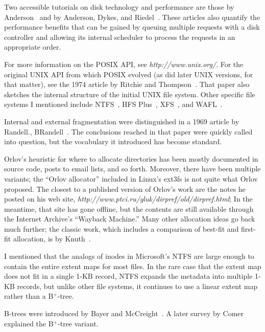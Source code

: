 Two accessible tutorials on disk technology and performance are those
by Anderson~\cite{max1118} and by Anderson, Dykes, and
Riedel~\cite{max1119}.  These articles also quantify the performance
benefits that can be gained by queuing multiple requests with a disk
controller and allowing its internal scheduler to process the requests
in an appropriate order.

For more information on the POSIX API, see
\textit{http://www.unix.org/}.  For the original UNIX API from which POSIX
evolved (as did later UNIX versions, for that matter), see the 1974
article by Ritchie and Thompson~\cite{jhs2.3}.  That paper also
sketches the internal structure of the initial UNIX file system.
Other specific file systems I mentioned include NTFS~\cite{max981},
HFS Plus~\cite{max1133}, XFS~\cite{max1110}, and WAFL~\cite{max1115}.

Internal and external fragmentation were distinguished in a 1969
article by {Randell., B}Randell~\cite{max1058}.  The conclusions reached in that
paper were quickly called into question, but the vocabulary it
introduced has become standard.

Orlov's heuristic for where to allocate directories has been mostly
documented in source code, posts to email lists, and so forth.
Moreover, there have been multiple variants; the ``Orlov allocator''
included in Linux's ext3fs is not quite what Orlov proposed.  The
closest to a published version of Orlov's work are the notes he posted on
his web site, \textit{http://www.ptci.ru/}\linebreak[0]\textit{gluk/dirpref/old/dirpref.html};
In the meantime, that site has gone offline, but the contents are still
available through the Internet Archive's ``Wayback Machine.''
Many other allocation
ideas go back much further; the classic work, which includes a
comparison of best-fit and first-fit allocation, is by
Knuth~\cite{max1138}.

I mentioned that the analogs of inodes in Microsoft's NTFS are large
enough to contain the entire extent maps for most files.  In the rare
case that the extent map does not fit in a single 1-KB record, NTFS
expands the metadata into multiple 1-KB records, but unlike other file
systems, it continues to use a linear extent map rather than a B$^+$-tree.

B-trees were introduced by Bayer and McCreight~\cite{max1114}.  A
later survey by Comer~\cite{max1049} explained the B${}^+$-tree variant.

